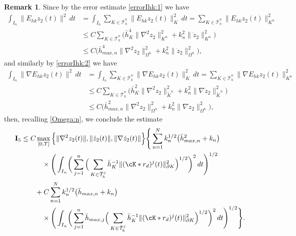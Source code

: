 \documentclass{amsart}
\numberwithin{equation}{section}
\theoremstyle{definition}
\newtheorem{remark}{Remark}
\begin{document}
\begin{remark}
Since by the error estimate \eqref{errorIhk:1} we have
\begin{equation*} 
  \begin{split}
    \int_{I_n}\!\|E_{hk}z_2(t)\|^2\,dt
    &=\int_{I_n}\!\sum_{K\in\bar{\mathcal T}_h^n}
    \|E_{hk}z_2(t)\|_K^2\,dt
    =\sum_{K\in\bar{\mathcal T}_h^n}
    \|E_{hk}z_2(t)\|_{K^n}^2\\
    &\le C \sum_{K\in\bar{\mathcal T}_h^n}
    \big(
    \bar h_K^{4}\|\nabla^{2}z_2\|_{K^n}^2
    +k_n^{2}\| \dot z_2\|_{K^n}^2\big)\\
    &\le C\big(
    \bar h_{max,n}^{4}\|\nabla^{2}z_2\|_{\Omega^n}^2
    +k_n^{2}\|\dot z_2\|_{\Omega^n}^2 \big),
  \end{split}
\end{equation*}
and similarly by \eqref{errorIhk:2} we have
\begin{equation*} 
  \begin{split}
    \int_{I_n}\!\|\nabla E_{hk}z_2(t)\|^2\,dt
    &=\int_{I_n}\!\sum_{K\in\bar{\mathcal T}_h^n}
    \|\nabla E_{hk}z_2(t)\|_K^2\,dt
    =\sum_{K\in\bar{\mathcal T}_h^n}
    \|\nabla E_{hk}z_2(t)\|_{K^n}^2\\
    &\le C \sum_{K\in\bar{\mathcal T}_h^n}
    \big(
    \bar h_K^2\|\nabla^2z_2\|_{\tilde K^n}^2
    +k_n^2\|\nabla \dot z_2\|_{\tilde K^n}^2\big)\\
    &\le C\big(
    \bar h_{max,n}^2\|\nabla^2z_2\|_{\Omega^n}^2
    +k_n^2\|\nabla \dot z_2\|_{\Omega^n}^2 \big),
  \end{split}
\end{equation*}
then, recalling \eqref{Omega:n}, we conclude the estimate
\begin{equation*}  
  \begin{split}
    {\rm{\bf I}}_5
    &\le C \max_{[0,T]}\Big\{\|\nabla^2z_2(t)\|,
     \|\dot z_2(t)\|,
     \|\nabla\dot z_2(t)\|\Big\}
    \Bigg\{
    \sum_{n=1}^N
    k_n^{1/2}\big(\bar h_{max,n}^2+k_n\big)\\
    &\quad\quad\quad\times
    \Bigg(\int_{I_n}\!\bigg(
    \sum_{j=1}^n
    \Big(\sum_{K\in\bar{\mathcal T}_h^j}\bar h_K^{-1}
    \|(\cK*r_d)^j(t)\|_{\partial K}^2
    \Big)^{1/2}\bigg)^2\,dt\Bigg)^{1/2}\\
    &\quad\quad+C\sum_{n=1}^N
    k_n^{1/2}\big(\bar h_{max,n}+k_n\big)\\
    &\quad\quad\quad\times
    \Bigg(\int_{I_n}\!\bigg(
    \sum_{j=1}^n \bar h_{max,j}
    \Big(\sum_{K\in\bar{\mathcal T}_h^j}\bar h_K^{-1}
    \|(\cK*r_d)^j(t)\|_{\partial K}^2
    \Big)^{1/2}\bigg)^2\,dt\Bigg)^{1/2} \Bigg\}.

\end{split}
\end{equation*}
\end{remark}
\end{document}
